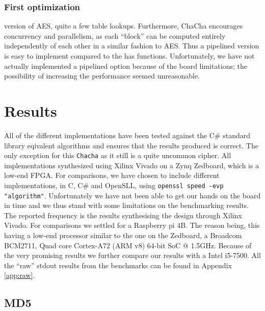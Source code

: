 \documentclass[a4paper, openany]{book}
\begin{document}
\subsection{First optimization}
\label{ChaCha1}
version of AES, quite a few table lookups. Furthermore, ChaCha encourages concurrency and parallelism, as each ``block'' can be computed entirely independently of each other in a similar fashion to AES. Thus a pipelined version is easy to implement compared to the has functions. Unfortunately, we have not actually implemented a pipelined option because of the board limitations; the possibility of increasing the performance seemed unreasonable.

\chapter{Results}
\label{sec:org18b24c3}
All of the different implementations have been tested against the C\# standard library eqivalent algorithms and ensures that the results produced is correct. The only exception for this \texttt{Chacha} as it still is a quite uncommon cipher. All implementations synthesized using Xilinx Vivado on a Zynq Zedboard, which is a low-end FPGA. For comparisons, we have chosen to include different implementations, in C, C\# and OpenSLL, using \texttt{openssl speed -evp "algorithm"}. Unfortunately we have not been able to get our hands on the board in time and we thus stand with some limitations on the benchmarking results. The reported frequency is the results synthesising the design through Xilinx Vivado. For comparisons we settled for a Raspberry pi 4B. The reason being, this having a low-end processor similar to the one on the Zedboard, a Broadcom BCM2711, Quad core Cortex-A72 (ARM v8) 64-bit SoC @ 1.5GHz. Because of the very promising results we further compare our results with a Intel i5-7500. All the ``raw'' stdout results from the benchmarks can be found in Appendix \ref{app:raw}.
\section{MD5}
\label{sec:org353a4d6}
\label{sec:MD5performance}
\end{document}

